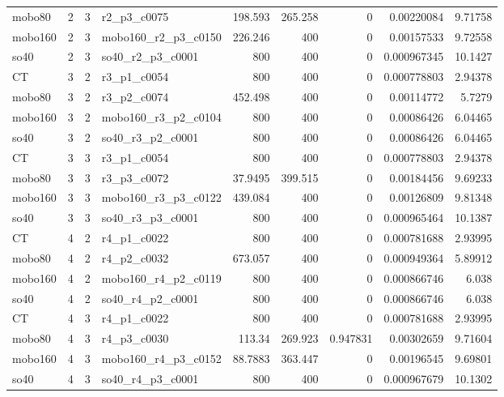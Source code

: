 \begin{tabular}{lrrlrrrrr}
mobo80 & 2 & 3 & r2\_p3\_c0075 & 198.593 & 265.258 & 0 & 0.00220084 & 9.71758 \\
mobo160 & 2 & 3 & mobo160\_r2\_p3\_c0150 & 226.246 & 400 & 0 & 0.00157533 & 9.72558 \\
so40 & 2 & 3 & so40\_r2\_p3\_c0001 & 800 & 400 & 0 & 0.000967345 & 10.1427 \\
CT & 3 & 2 & r3\_p1\_c0054 & 800 & 400 & 0 & 0.000778803 & 2.94378 \\
mobo80 & 3 & 2 & r3\_p2\_c0074 & 452.498 & 400 & 0 & 0.00114772 & 5.7279 \\
mobo160 & 3 & 2 & mobo160\_r3\_p2\_c0104 & 800 & 400 & 0 & 0.00086426 & 6.04465 \\
so40 & 3 & 2 & so40\_r3\_p2\_c0001 & 800 & 400 & 0 & 0.00086426 & 6.04465 \\
CT & 3 & 3 & r3\_p1\_c0054 & 800 & 400 & 0 & 0.000778803 & 2.94378 \\
mobo80 & 3 & 3 & r3\_p3\_c0072 & 37.9495 & 399.515 & 0 & 0.00184456 & 9.69233 \\
mobo160 & 3 & 3 & mobo160\_r3\_p3\_c0122 & 439.084 & 400 & 0 & 0.00126809 & 9.81348 \\
so40 & 3 & 3 & so40\_r3\_p3\_c0001 & 800 & 400 & 0 & 0.000965464 & 10.1387 \\
CT & 4 & 2 & r4\_p1\_c0022 & 800 & 400 & 0 & 0.000781688 & 2.93995 \\
mobo80 & 4 & 2 & r4\_p2\_c0032 & 673.057 & 400 & 0 & 0.000949364 & 5.89912 \\
mobo160 & 4 & 2 & mobo160\_r4\_p2\_c0119 & 800 & 400 & 0 & 0.000866746 & 6.038 \\
so40 & 4 & 2 & so40\_r4\_p2\_c0001 & 800 & 400 & 0 & 0.000866746 & 6.038 \\
CT & 4 & 3 & r4\_p1\_c0022 & 800 & 400 & 0 & 0.000781688 & 2.93995 \\
mobo80 & 4 & 3 & r4\_p3\_c0030 & 113.34 & 269.923 & 0.947831 & 0.00302659 & 9.71604 \\
mobo160 & 4 & 3 & mobo160\_r4\_p3\_c0152 & 88.7883 & 363.447 & 0 & 0.00196545 & 9.69801 \\
so40 & 4 & 3 & so40\_r4\_p3\_c0001 & 800 & 400 & 0 & 0.000967679 & 10.1302 \\
\bottomrule
\end{tabular}
